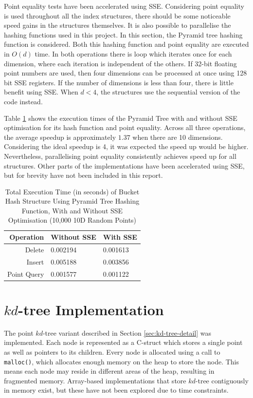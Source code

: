 Point equality tests have been accelerated using SSE. Considering point equality is used throughout all the index structures, there should be some noticeable speed gains in the structures themselves. It is also possible to parallelise the hashing functions used in this project. In this section, the Pyramid tree hashing function is considered. Both this hashing function and point equality are executed in $O(d)$ time. In both operations there is loop which iterates once for each dimension, where each iteration is independent of the others. If 32-bit floating point numbers are used, then four dimensions can be processed at once using 128 bit SSE registers. If the number of dimensions is less than four, there is little benefit using SSE. When $d<4$, the structures use the sequential version of the code instead.

Table \ref{tab:pyramid-sse} shows the execution times of the Pyramid Tree with and without SSE optimisation for its hash function and point equality. Across all three operations, the average speedup is approximately $1.37$ when there are 10 dimensions. Considering the ideal speedup is 4, it was expected the speed up would be higher. Nevertheless, parallelising point equality consistently achieves speed up for all structures. Other parts of the implementations have been accelerated using SSE, but for brevity have not been included in this report.

\begin{table}
	\centering
	\begin{tabular}{|r|l|l|}
		\hline
		\textbf{Operation} & \textbf{Without SSE} & \textbf{With SSE} \\
		\hline
		Delete & 0.002194 & 0.001613 \\
		Insert & 0.005188 & 0.003856 \\
		Point Query & 0.001577 & 0.001122 \\
		\hline
	\end{tabular}
	\caption{Total Execution Time (in seconds) of Bucket Hash Structure Using Pyramid Tree Hashing Function, With and Without SSE Optimisation (10,000 10D Random Points)}
	\label{tab:pyramid-sse}
\end{table}

\section{$kd$-tree Implementation}

The point $kd$-tree variant described in Section \ref{sec:kd-tree-detail} was implemented. Each node is represented as a C-struct which stores a single point as well as pointers to its children. Every node is allocated using a call to \texttt{malloc()}, which allocates enough memory on the heap to store the node. This means each node may reside in different areas of the heap, resulting in fragmented memory. Array-based implementations that store $kd$-tree contiguously in memory exist, but these have not been explored due to time constraints.